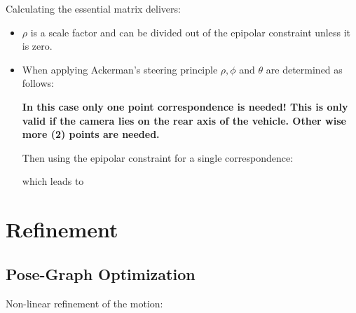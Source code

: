 \documentclass[10pt,a4paper]{scrartcl}
\begin{document}
\begin{multicols*}{2}
Calculating the essential matrix delivers:


\begin{itemize}
\item $\rho$ is a scale factor and can be divided out of the epipolar constraint unless it is zero.
\item When applying Ackerman's steering principle $\rho,\phi$ and $\theta$ are determined as follows:


\textbf{In this case only one point correspondence is needed! This is only valid if the camera lies on the rear axis of the vehicle. Other wise more (2) points are needed.}


Then using the epipolar constraint for a single correspondence:


which leads to


\end{itemize}

\section{Refinement}

\subsection{Pose-Graph Optimization}

Non-linear refinement of the motion:



\end{multicols*}
\end{document}
